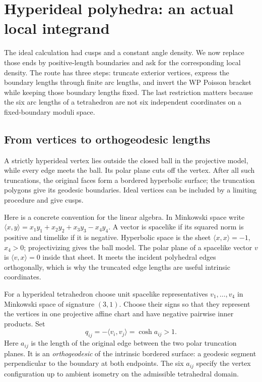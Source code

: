 \section{Hyperideal polyhedra: an actual local integrand}
\label{sec:hyperideal}

The ideal calculation had cusps and a constant angle density. We now
replace those ends by positive-length boundaries and ask for the
corresponding local density. The route has three steps: truncate
exterior vertices, express the boundary lengths through finite arc
lengths, and invert the WP Poisson bracket while keeping those boundary
lengths fixed. The last restriction matters because the six arc lengths
of a tetrahedron are not six independent coordinates on a fixed-boundary
moduli space.

\subsection{From vertices to orthogeodesic lengths}

A strictly hyperideal vertex lies outside the closed ball in the projective
model, while every edge meets the ball. Its polar plane cuts off the vertex.
After all such truncations, the original faces form a bordered hyperbolic
surface; the truncation polygons give its geodesic boundaries. Ideal vertices
can be included by a limiting procedure and give cusps.

Here is a concrete convention for the linear algebra. In Minkowski
space write $\langle x,y\rangle=x_1y_1+x_2y_2+x_3y_3-x_4y_4$.
A vector is spacelike if its squared norm is positive and timelike if
it is negative. Hyperbolic space is the sheet
$\langle x,x\rangle=-1$, $x_4>0$; projectivizing gives the ball
model. The polar plane of a spacelike vector $v$ is
$\langle v,x\rangle=0$ inside that sheet. It meets the incident
polyhedral edges orthogonally, which is why the truncated edge lengths
are useful intrinsic coordinates.

For a hyperideal tetrahedron choose unit spacelike representatives
$v_1,\ldots,v_4$ in Minkowski space of signature $(3,1)$. Choose their signs
so that they represent the vertices in one projective affine chart and
have negative pairwise inner products. Set
\begin{equation}
 q_{ij}=-\langle v_i,v_j\rangle=\cosh a_{ij}>1.
 \label{eq:qvertices}
\end{equation}
Here $a_{ij}$ is the length of the original edge between the two polar
truncation planes. It is an \emph{orthogeodesic} of the intrinsic bordered surface:
a geodesic segment perpendicular to the boundary at both endpoints.
The six $a_{ij}$ specify the vertex configuration up to ambient isometry on
the admissible tetrahedral domain.


